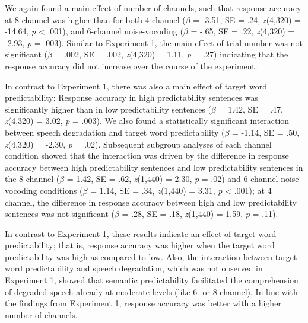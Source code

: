 \documentclass[a4paper, nobind]{templates/ociamthesis}
\begin{document}
We again found a main effect of number of channels, such that response accuracy at 8-channel was higher than for both 4-channel
(\(\beta\) = -3.51, SE = .24, \emph{z}(4,320) = -14.64, \emph{p} \textless{} .001),
and 6-channel noise-vocoding (\(\beta\) = -.65, SE = .22, \emph{z}(4,320) = -2.93, \emph{p} = .003).
Similar to Experiment 1, the main effect of trial number was not significant
(\(\beta\) = .002, SE = .002, \emph{z}(4,320) = 1.11, \emph{p} = .27) indicating that the response accuracy did not increase over the course of the experiment.

In contrast to Experiment 1, there was also a main effect of target word predictability: Response accuracy in high predictability sentences was significantly higher than in low predictability sentences
(\(\beta\) = 1.42, SE = .47, \emph{z}(4,320) = 3.02, \emph{p} = .003).
We also found a statistically significant interaction between speech degradation and target word predictability
(\(\beta\) = -1.14, SE = .50, \emph{z}(4,320) = -2.30, \emph{p} = .02).
Subsequent subgroup analyses of each channel condition showed that the interaction was driven by the difference in response accuracy between high predictability sentences and low predictability sentences
in the 8-channel (\(\beta\) = 1.42, SE = .62, \emph{z}(1,440) = 2.30, \emph{p} = .02)
and 6-channel noise-vocoding conditions (\(\beta\) = 1.14, SE = .34, \emph{z}(1,440) = 3.31, \emph{p} \textless{} .001);
at 4 channel, the difference in response accuracy between high and low predictability sentences was not significant
(\(\beta\) = .28, SE = .18, \emph{z}(1,440) = 1.59, \emph{p} = .11).

In contrast to Experiment 1, these results indicate an effect of target word predictability;
that is, response accuracy was higher when the target word predictability was high as compared to low.
Also, the interaction between target word predictability and speech degradation, which was not observed in Experiment 1,
showed that semantic predictability facilitated the comprehension of degraded speech already at moderate levels (like 6- or 8-channel).
In line with the findings from Experiment 1, response accuracy was better with a higher number of channels.
\end{document}
